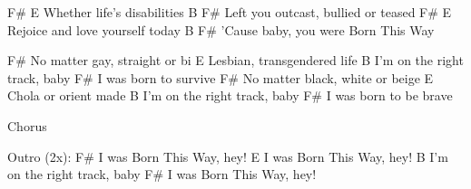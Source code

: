 \begin{multicols}{2}
\begin{lstsong}
F#                 E
Whether life's disabilities
      B           F#
Left you outcast, bullied or teased
F#               E
Rejoice and love yourself today
B                     F#
'Cause baby, you were Born This Way
\end{lstsong}\vfill\columnbreak\begin{lstsong}
          F#
No matter gay, straight or bi
         E
Lesbian, transgendered life
           B
I'm on the right track, baby
      F#
I was born to survive
          F#
No matter black, white or beige
         E
Chola or orient made
           B
I'm on the right track, baby
      F#
I was born to be brave

Chorus

Outro (2x):
      F#
I was Born This Way, hey!
      E
I was Born This Way, hey!
           B
I'm on the right track, baby
      F#
I was Born This Way, hey!
\end{lstsong}
\end{multicols}
\newpage

